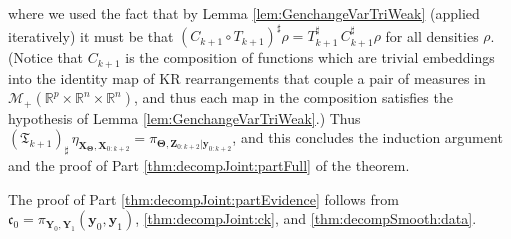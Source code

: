 \documentclass[twoside,11pt]{article}
\newcommand{\push}{_\sharp}                                      %
\newcommand{\borelm}{\mathscr{M}}
\newcommand{\borelmp}{\borelm_+}
\newcommand{\re}{\mathbb{R}}
\newcommand{\Xb}{\boldsymbol{X}}
\newcommand{\Yb}{\boldsymbol{Y}}
\newcommand{\yb}{\boldsymbol{y}}
\newcommand{\Zb}{\boldsymbol{Z}}
\newcommand{\vhyp}{\boldsymbol{\Theta}}
\newcommand{\dhyp}{p}
\newcommand{\pull}{^\sharp}
\begin{document}
%
%
%
%
where we used the fact that
by Lemma \ref{lem:GenchangeVarTriWeak} (applied
iteratively) it must be that 
$(C_{k+1} \circ T_{k+1})\pull \rho = T_{k+1} \pull \, C_{k+1} \pull \rho$
for all densities $\rho$. 
%
(Notice that $C_{k+1}$ 
is the composition of functions which are trivial embeddings into
the identity map of KR rearrangements that couple a pair
of measures in $\borelmp(\re^\dhyp \times \re^n \times \re^n)$, %
and thus each map in the composition satisfies
the hypothesis of Lemma \ref{lem:GenchangeVarTriWeak}.)
%
Thus 
$(\mathfrak{T}_{k+1})\push\,\eta_{\Xb_{\vhyp},\Xb_{0:k+2}} = 
\pi_{{\vhyp},\Zb_{0:k+2}\vert \yb_{0:k+2}}$, and this concludes
the induction argument and the proof of Part \ref{thm:decompJoint:partFull} of the theorem.
%

The proof of Part \ref{thm:decompJoint:partEvidence} follows from
$\mathfrak{c}_0 =  \pi_{\Yb_0,\Yb_1}(\yb_0,\yb_1)$,
\eqref{thm:decompJoint:ck}, and \eqref{thm:decompSmooth:data}. 
\hfill\BlackBox\\[2mm]


%
%
%
%
%
%
%
%
%
%
%
%
%
%
%
%
%
%
%
%
%
%
%
%
%
%
%

%
%
%
%
%
%
%
%
%
%
%
%
%
%
%
%
%
%
%
%
%
%
%
%
%
%
%
%
%
%
%
%
%
%

%
%
%
%
%
%
%
%
%
%
%
%
%
%
%
%
%
%

%
%
%
%
%
%
%
%
%
%
%
%
%
%
%
%
%
%
%
%
%
%
%
%
%
%
%
%
%
%
%
%
%
%
%
%
%
%
%
%
%
%
%
%
%
%
%
%
%
%
%
%
%
%
%
%
%
%
%
%
%
%
%
%
%
%
%


%

%
%
%
%
%
%
%
%
%
%
%
%
%
%
%
%
%
%
%
%
%
%
%
%

%
%
%
%
%
%
%
%
%
%
%
%
%
%
%
%
%


%
%
%
%
%
%
%
%
%
%
%
%
%
%
%
%
%
%
%
%
%
%
%
%
%
%
%
%
%
%
%
%
%
%
%
%
%
%
%
%
%
%
%
%
%
%
%
%
%
%
%
%
%
%
%

%
%
%
%
%
%
%
%
%
%
%
%
%
%
%
%
%
%
%
%
%
%
%
%
%
%
%
%
%
%
%
%
%
%
%
%
%
%
%
%
%
%
%
%
%
%
%
%
%
%

 




%
\end{document}
